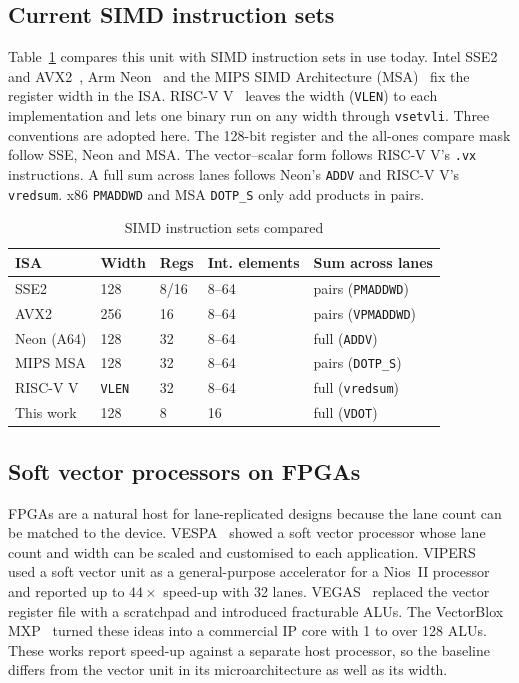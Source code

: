 \documentclass[conference]{IEEEtran}
\begin{document}
\subsection{Current SIMD instruction sets}
Table~\ref{tab:isas} compares this unit with SIMD instruction sets in use today.
Intel SSE2 and AVX2~\cite{intelsdm}, Arm Neon~\cite{armarm} and the MIPS SIMD
Architecture (MSA)~\cite{msa} fix the register width in the ISA. RISC-V V~\cite{rvv}
leaves the width (\texttt{VLEN}) to each implementation and lets one binary run on any
width through \texttt{vsetvli}. Three conventions are adopted here. The 128-bit
register and the all-ones compare mask follow SSE, Neon and MSA. The vector--scalar
form follows RISC-V V's \texttt{.vx} instructions. A full sum across lanes follows
Neon's \texttt{ADDV} and RISC-V V's \texttt{vredsum}. x86 \texttt{PMADDWD} and
MSA \texttt{DOTP\_S} only add products in pairs.

\begin{table}[t]
\centering
\caption{SIMD instruction sets compared}
\label{tab:isas}
\footnotesize
\begin{tabular}{lllll}
\toprule
ISA & Width & Regs & Int. elements & Sum across lanes \\
\midrule
SSE2 & 128 & 8/16 & 8--64 & pairs (\texttt{PMADDWD}) \\
AVX2 & 256 & 16 & 8--64 & pairs (\texttt{VPMADDWD}) \\
Neon (A64) & 128 & 32 & 8--64 & full (\texttt{ADDV}) \\
MIPS MSA & 128 & 32 & 8--64 & pairs (\texttt{DOTP\_S}) \\
RISC-V V & \texttt{VLEN} & 32 & 8--64 & full (\texttt{vredsum}) \\
This work & 128 & 8 & 16 & full (\texttt{VDOT}) \\
\bottomrule
\end{tabular}
\end{table}

\subsection{Soft vector processors on FPGAs}
FPGAs are a natural host for lane-replicated designs because the lane count can be
matched to the device. VESPA~\cite{vespa} showed a soft vector processor whose lane
count and width can be scaled and customised to each application. VIPERS~\cite{vipers}
used a soft vector unit as a general-purpose accelerator for a Nios~II processor and
reported up to $44\times$ speed-up with 32 lanes. VEGAS~\cite{vegas} replaced the
vector register file with a scratchpad and introduced fracturable ALUs. The
VectorBlox MXP~\cite{mxp} turned these ideas into a commercial IP core with 1 to over
128 ALUs. These works report speed-up against a separate host processor, so the
baseline differs from the vector unit in its microarchitecture as well as its width.
\end{document}
